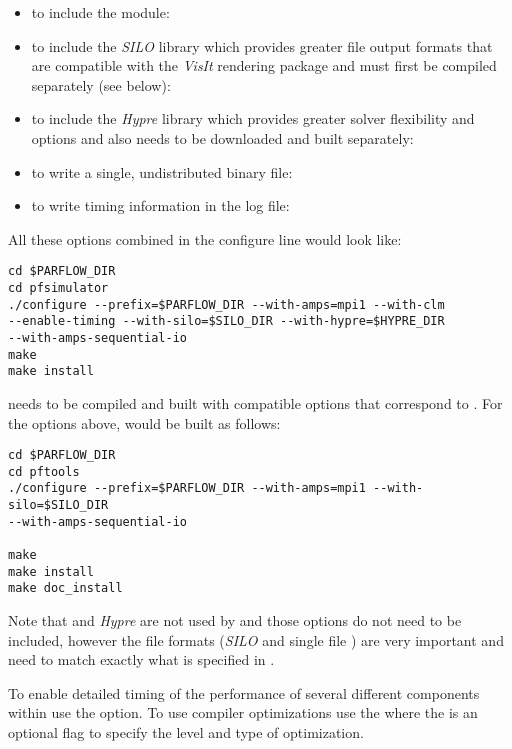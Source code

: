 \begin{enumerate}
\begin{itemize}
\item to include the  module:  
\item to include the \emph{SILO} 
library which provides greater file output formats that are compatible
with the \emph{VisIt} rendering package and must first be compiled 
separately (see below): 
\item to include the \emph{Hypre} library which provides greater solver
flexibility and options and also needs to be downloaded and built separately:
\item to write a single, undistributed \parflow{} binary file:
\item to write timing information in the log file: 
\end{itemize}

All these options combined in the configure line would look like:

\begin{display}\begin{verbatim}
cd $PARFLOW_DIR
cd pfsimulator
./configure --prefix=$PARFLOW_DIR --with-amps=mpi1 --with-clm 
--enable-timing --with-silo=$SILO_DIR --with-hypre=$HYPRE_DIR
--with-amps-sequential-io
make 
make install
\end{verbatim}\end{display}

 needs to be compiled and built with compatible options
that correspond to \parflow{}.  For the options above,  would
be built as follows:

\begin{display}\begin{verbatim}
cd $PARFLOW_DIR
cd pftools
./configure --prefix=$PARFLOW_DIR --with-amps=mpi1 --with-silo=$SILO_DIR
--with-amps-sequential-io

make 
make install
make doc_install
\end{verbatim}\end{display}

Note that  and \emph{Hypre} are not used by  and
those options do not need to be included, however the file formats (\emph{SILO} 
and single file ) are very important and need to match exactly what is
specified in .

To enable detailed timing of the performance of several different
components within \parflow{} use the  option.
To use compiler optimizations use the  where
the  is an optional flag to specify the level and type
of optimization.


\end{enumerate}
